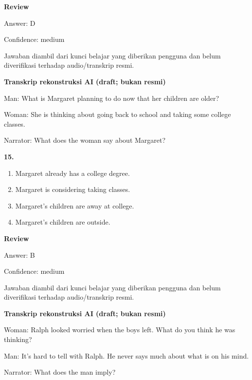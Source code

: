 \documentclass[12pt]{article}
\begin{document}
\par
\begingroup
\setlength{\parskip}{0pt}
\setlength{\parindent}{0pt}
\textbf{Review}\par
Answer: D\par
Confidence: medium\par
Jawaban diambil dari kunci belajar yang diberikan pengguna dan belum diverifikasi terhadap audio/transkrip resmi.\par
\endgroup
\par
\vspace{0.25\baselineskip}
\begin{exampleblock}
\textbf{Transkrip rekonstruksi AI (draft; bukan resmi)}\par
Man: What is Margaret planning to do now that her children are older?\par
Woman: She is thinking about going back to school and taking some college classes.\par
Narrator: What does the woman say about Margaret?\par
\end{exampleblock}
\noindent\textbf{15.}
\begin{enumerate}[label=(\Alph*),leftmargin=*,itemsep=0.2em]
\item Margaret already has a college degree.
\item Margaret is considering taking classes.
\item Margaret's children are away at college.
\item Margaret's children are outside.
\end{enumerate}
\par
\begingroup
\setlength{\parskip}{0pt}
\setlength{\parindent}{0pt}
\textbf{Review}\par
Answer: B\par
Confidence: medium\par
Jawaban diambil dari kunci belajar yang diberikan pengguna dan belum diverifikasi terhadap audio/transkrip resmi.\par
\endgroup
\par
\vspace{0.25\baselineskip}
\begin{exampleblock}
\textbf{Transkrip rekonstruksi AI (draft; bukan resmi)}\par
Woman: Ralph looked worried when the boys left. What do you think he was thinking?\par
Man: It's hard to tell with Ralph. He never says much about what is on his mind.\par
Narrator: What does the man imply?\par
\end{exampleblock}
\end{document}
